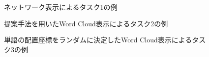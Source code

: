 \documentclass[syuuron]{kuee}
\begin{document}
		\begin{figure}
			\begin{center}
			\end{center}
			\caption{ネットワーク表示によるタスク1の例}
	  		\label{fig:que1}
		\end{figure}
		\begin{figure}
			\begin{center}
			\end{center}
			\caption{提案手法を用いたWord Cloud表示によるタスク2の例}
	  		\label{fig:que2}
		\end{figure}
		\begin{figure}
			\begin{center}
			\end{center}
			\caption{単語の配置座標をランダムに決定したWord Cloud表示によるタスク3の例}
	  		\label{fig:que3}
		\end{figure}
\end{document}

